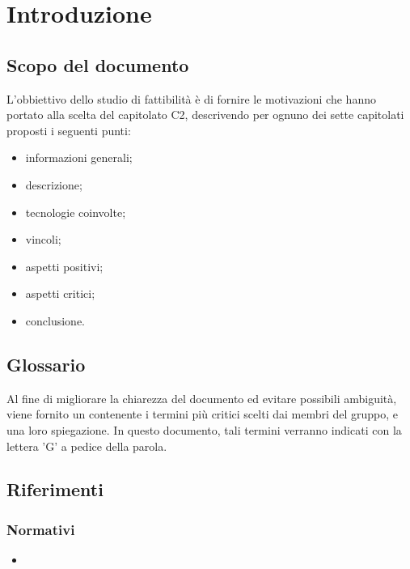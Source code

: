 \section{Introduzione}

\subsection{Scopo del documento}
L'obbiettivo dello studio di fattibilità è di fornire le motivazioni che hanno portato alla scelta del capitolato C2, descrivendo per ognuno dei sette capitolati proposti i seguenti punti:
\begin{itemize}
\item informazioni generali;
\item descrizione;
\item tecnologie coinvolte;
\item vincoli;
\item aspetti positivi;
\item aspetti critici;
\item conclusione.
\end{itemize}

\subsection{Glossario}
Al fine di migliorare la chiarezza del documento ed evitare possibili ambiguità, viene fornito un \Glossario{} contenente i termini più critici scelti dai membri del gruppo, e una loro spiegazione. In questo documento, tali termini verranno indicati con la lettera 'G' a pedice della parola. 

\subsection{Riferimenti}
\subsubsection{Normativi}
\begin{itemize}
\item {}
\end{itemize}
\sloppy
